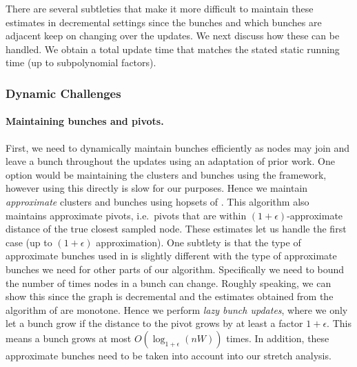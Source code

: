 
There are several subtleties that make it more difficult to maintain these estimates in decremental settings since the bunches and which bunches are adjacent keep on changing over the updates. We next discuss how these can be handled. We obtain a total update time that matches the stated static running time (up to subpolynomial factors). %

    
\subsubsection{Dynamic Challenges}\label{sec:overview_dynamic}
\paragraph{Maintaining bunches and pivots.}
First, we need to dynamically maintain bunches efficiently as nodes may join and leave a bunch throughout the updates using an adaptation of prior work. One option would be maintaining the clusters and bunches using the \cite{RZ12} framework, however using this directly is slow for our purposes. Hence we maintain \textit{approximate} clusters and bunches using hopsets of \cite{LN2020}. This algorithm also maintains approximate pivots, i.e.~pivots that are within $(1+\epsilon)$-approximate distance of the true closest sampled node. These estimates let us handle the first case (up to $(1+\epsilon)$ approximation).
One subtlety is that the type of approximate bunches used in \cite{LN2020} is slightly different with the type of approximate bunches we need for other parts of our algorithm. Specifically we need to bound the number of times nodes in a bunch can change. Roughly speaking, we can show this since the graph is decremental and the estimates obtained from the algorithm of \cite{LN2020} are monotone. Hence we perform \emph{lazy bunch updates}, where we only let a bunch grow if the distance to the pivot grows by at least a factor $1+\epsilon$. This means a bunch grows at most $O(\log_{1+\epsilon}(nW))$ times. In addition, these approximate bunches need to be taken into account into our stretch analysis. 

